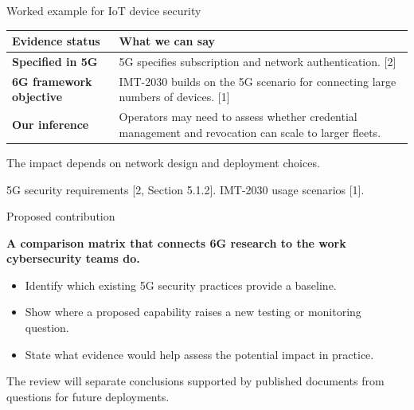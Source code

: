 \documentclass[aspectratio=169,11pt]{beamer}
\newcommand{\source}[1]{\par\vfill{\footnotesize\color{Muted}#1}\par\vspace{.18cm}}
\begin{document}
\begin{frame}[t]{Worked example for IoT device security}
\vspace{.36cm}
\renewcommand{\arraystretch}{1.37}
\begin{tabularx}{\textwidth}{@{}>{\raggedright\arraybackslash}p{4.10cm}Y@{}}
\toprule
\textbf{Evidence status} & \textbf{What we can say}\\
\midrule
\textbf{Specified in 5G} & 5G specifies subscription and network authentication. [2]\\
\textbf{6G framework objective} & IMT-2030 builds on the 5G scenario for connecting large numbers of devices. [1]\\
\textbf{Our inference} & Operators may need to assess whether credential management and revocation can scale to larger fleets.\\
\bottomrule
\end{tabularx}
\vspace{.28cm}

{\footnotesize\color{Muted}The impact depends on network design and deployment choices.}
\source{5G security requirements [2, Section 5.1.2]. IMT-2030 usage scenarios [1].}
\end{frame}

\begin{frame}[t]{Proposed contribution}
\vspace{.38cm}
{\Large\bfseries A comparison matrix that connects 6G research to the work cybersecurity teams do.\par}
\vspace{.43cm}
\begin{itemize}
\setlength{\itemsep}{.23cm}
  \item Identify which existing 5G security practices provide a baseline.
  \item Show where a proposed capability raises a new testing or monitoring question.
  \item State what evidence would help assess the potential impact in practice.
\end{itemize}
\vspace{.30cm}

{\color{Muted}The review will separate conclusions supported by published documents from questions for future deployments.}
\end{frame}
\end{document}
